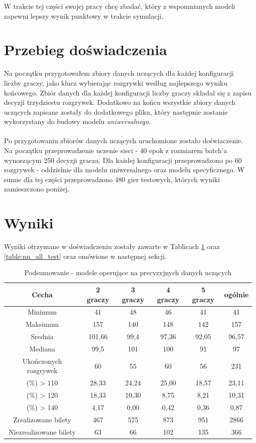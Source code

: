 \documentclass[12pt, oneside]{report}
\begin{document}
W trakcie tej części swojej pracy chcę zbadać, który z wspomnianych modeli zapewni lepszy wynik punktowy w trakcie symulacji.
\section{Przebieg doświadczenia}
Na początku przygotowałem zbiory danych uczących dla każdej konfiguracji liczby graczy, jako klucz wybierając rozgrywki według najlepszego wyniku końcowego. Zbiór danych dla każdej konfiguracji liczby graczy składał się z zapisu decyzji trzydziestu rozgrywek. Dodatkowo na końcu wszystkie zbiory danych uczących zapisane zostały do dodatkowego pliku, który następnie zostanie wykorzystany do budowy modelu \textit{uniwersalnego}. \\ \\
Po przygotowaniu zbiorów danych uczących uruchomione zostało doświaczenie. Na początku przeprowadzenie uczenie sieci - 40 epok z rozmiarem batch'a wynoszącym 250 decyzji gracza. Dla każdej konfiguracji przeprowadzono po 60 rozgrywek - oddzielnie dla modelu uniwersalnego oraz modelu specyficznego. W sumie dla tej części przeprowadzono 480 gier testowych, których wyniki zamieszczono poniżej.
\section{Wyniki}
Wyniki otrzymane w doświadczeniu zostały zawarte w Tablicach \ref{table:nn_single_test} oraz  \ref{table:nn_all_test} oraz omówione w następnej sekcji.
\begin{table}[h]
	\begin{center}
		\begin{tabular}{| c | c | c | c | c | c |} \hline
			Cecha & 2 graczy & 3 graczy & 4 graczy & 5 graczy & ogólnie \\ \hline
			Minimum & 41 & 48 & 46 & 41 & 41 \\ \hline
			Maksimum & 157 & 140 & 148 & 142 & 157 \\ \hline
			Srednia & 101,66 & 99,4 & 97,36 & 92,05 & 96,57 \\ \hline
			Mediana & 99,5 & 101 & 100 & 91 & 97 \\ \hline
			Ukończonych rozgrywek & 60 & 55 & 60 & 56 & 231 \\ \hline
			(\%) > 110 & 28,33 & 24,24 & 25,00 & 18,57 & 23,11 \\ \hline
			(\%) > 120 & 18,33 & 10,30 & 8,75 & 8,21 & 10,31 \\ \hline
			(\%) > 140 & 4,17 & 0,00 & 0,42 & 0,36 & 0,87 \\ \hline
			Zrealizowane bilety & 467 & 575 & 873 & 951 & 2866 \\ \hline
			Niezrealizowane bilety & 63 & 66 & 102 & 135 & 366 \\ \hline
		\end{tabular}
		\caption{Podsumowanie - modele operujące na precyzyjnych danych uczących}
		\label{table:nn_single_test}
	\end{center}
\end{table}
\end{document}
